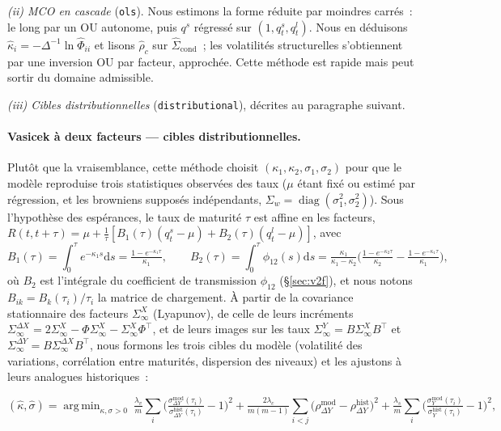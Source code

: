 \documentclass[11pt,a4paper]{article}
\theoremstyle{definition}
\DeclareMathOperator{\diag}{diag}
\DeclareMathOperator*{\argmin}{arg\,min}
\newcommand{\transp}{^{\!\top}}
\newcommand{\dd}{\mathrm{d}}
\newcommand{\Dt}{\Delta}
\begin{document}
\emph{(ii) MCO en cascade} (\texttt{ols}). Nous estimons la forme réduite par moindres carrés~: le long par un OU autonome, puis $q^s$ régressé sur $(1,q^s_t,q^l_t)$. Nous en déduisons $\hat\kappa_i=-\Dt^{-1}\ln\widehat\Phi_{ii}$ et lisons $\hat\rho_c$ sur $\widehat\Sigma_{\mathrm{cond}}$~; les volatilités structurelles s'obtiennent par une inversion OU par facteur, approchée. Cette méthode est rapide mais peut sortir du domaine admissible.

\emph{(iii) Cibles distributionnelles} (\texttt{distributional}), décrites au paragraphe suivant.

\paragraph{Vasicek à deux facteurs --- cibles distributionnelles.}
Plutôt que la vraisemblance, cette méthode choisit $(\kappa_1,\kappa_2,\sigma_1,\sigma_2)$ pour que le modèle reproduise trois statistiques observées des taux ($\mu$ étant fixé ou estimé par régression, et les browniens supposés indépendants, $\Sigma_w=\diag(\sigma_1^2,\sigma_2^2)$). Sous l'hypothèse des espérances, le taux de maturité $\tau$ est affine en les facteurs, $R(t,t+\tau)=\mu+\tfrac1\tau[B_1(\tau)(q^s_t-\mu)+B_2(\tau)(q^l_t-\mu)]$, avec
\[
B_1(\tau)=\!\int_0^\tau\!e^{-\kappa_1 s}\dd s=\tfrac{1-e^{-\kappa_1\tau}}{\kappa_1},\qquad
B_2(\tau)=\!\int_0^\tau\!\phi_{12}(s)\dd s=\tfrac{\kappa_1}{\kappa_1-\kappa_2}\Big(\tfrac{1-e^{-\kappa_2\tau}}{\kappa_2}-\tfrac{1-e^{-\kappa_1\tau}}{\kappa_1}\Big),
\]
où $B_2$ est l'intégrale du coefficient de transmission $\phi_{12}$ (\S\ref{sec:v2f}), et nous notons $B_{ik}=B_k(\tau_i)/\tau_i$ la matrice de chargement. À partir de la covariance stationnaire des facteurs $\Sigma^X_\infty$ (Lyapunov), de celle de leurs incréments $\Sigma^{\Delta X}_\infty=2\Sigma^X_\infty-\Phi\Sigma^X_\infty-\Sigma^X_\infty\Phi\transp$, et de leurs images sur les taux $\Sigma^Y_\infty=B\Sigma^X_\infty B\transp$ et $\Sigma^{\Delta Y}_\infty=B\Sigma^{\Delta X}_\infty B\transp$, nous formons les trois cibles du modèle (volatilité des variations, corrélation entre maturités, dispersion des niveaux) et les ajustons à leurs analogues historiques~:
\begin{definitionbox}
\[
(\hat\kappa,\hat\sigma)=\argmin_{\kappa,\sigma>0}\
\tfrac{\lambda_v}{m}\!\sum_i\!\Big(\tfrac{\sigma^{\mathrm{mod}}_{\Delta Y}(\tau_i)}{\sigma^{\mathrm{hist}}_{\Delta Y}(\tau_i)}-1\Big)^2
+\tfrac{2\lambda_c}{m(m-1)}\!\sum_{i<j}\!\big(\rho^{\mathrm{mod}}_{\Delta Y}-\rho^{\mathrm{hist}}_{\Delta Y}\big)^2
+\tfrac{\lambda_s}{m}\!\sum_i\!\Big(\tfrac{\sigma^{\mathrm{mod}}_{Y}(\tau_i)}{\sigma^{\mathrm{hist}}_{Y}(\tau_i)}-1\Big)^2,
\]
\end{definitionbox}
\end{document}
